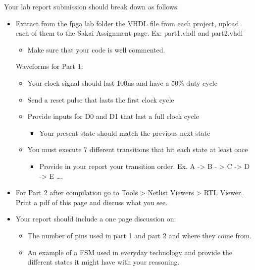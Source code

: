 Your lab report submission should break down as follows:
\begin{itemize}

	\item Extract from the fpga lab folder the VHDL ﬁle from each project, upload each of them to the Sakai Assignment page. Ex: part1.vhdl and part2.vhdl
	\begin{itemize}
		\item Make sure that your code is well commented.
	\end{itemize}
	
	Waveforms for Part 1:
	\begin{itemize}
		\item Your clock signal should last 100ns and have a 50\% duty cycle
		
		\item Send a reset pulse that lasts the first clock cycle
		
		\item Provide inputs for D0 and D1 that last a full clock cycle
		\begin{itemize}
			\item Your present state should match the previous next state
		\end{itemize}
		
		\item You must execute 7 different transitions that hit each state at least once
		\begin{itemize}
			\item Provide in your report your transition order. Ex. A -> B - > C -> D -> E ….
		\end{itemize}
	\end{itemize}
	
	\item For Part 2 after compilation go to Tools > Netlist Viewers > RTL Viewer. Print a pdf of this page and discuss what you see.
	
	\item Your report should include a one page discussion on:
	\begin{itemize}
		\item The number of pins used in part 1 and part 2 and where they come from.
		\item An example of a FSM used in everyday technology and provide the different states it might have with your reasoning.
	\end{itemize}
	
\end{itemize}


